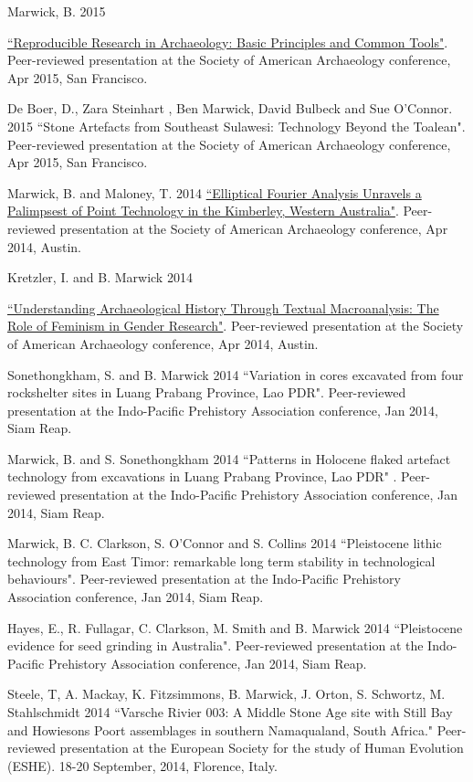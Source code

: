 \ind Marwick, B. 2015 {\href{https://github.com/benmarwick/SAA2015-Open-Methods}{``Reproducible Research in Archaeology: Basic Principles and Common Tools"}. Peer-reviewed presentation at the Society of American Archaeology conference, Apr 2015, San Francisco.

\ind De Boer, D., Zara Steinhart , Ben Marwick, David Bulbeck and Sue O'Connor. 2015 ``Stone Artefacts from Southeast Sulawesi: Technology Beyond the Toalean". Peer-reviewed presentation at the Society of American Archaeology conference, Apr 2015, San Francisco.

\ind Marwick, B. and Maloney, T. 2014 {\href{https://github.com/benmarwick/marwick-and-maloney-saa2014}{``Elliptical Fourier Analysis Unravels a Palimpsest of Point Technology  in the Kimberley, Western Australia"}}. Peer-reviewed presentation at the Society of American Archaeology conference, Apr 2014, Austin.

\ind Kretzler, I. and B. Marwick 2014 {\href{https://github.com/benmarwick/kretzler-and-marwick-saa2014}{``Understanding Archaeological History Through Textual Macroanalysis: The Role of Feminism in Gender Research"}. Peer-reviewed presentation at the Society of American Archaeology conference, Apr 2014, Austin.

\ind Sonethongkham, S. and B. Marwick 2014 ``Variation in cores excavated from four rockshelter sites in Luang Prabang Province, Lao PDR". Peer-reviewed presentation at the Indo-Pacific Prehistory Association conference, Jan 2014, Siam Reap.

\ind Marwick, B.  and S. Sonethongkham 2014 ``Patterns in Holocene flaked artefact technology from excavations in Luang Prabang Province, Lao PDR" . Peer-reviewed presentation at the Indo-Pacific Prehistory Association conference, Jan 2014, Siam Reap.

\ind Marwick, B. C. Clarkson, S. O’Connor and S. Collins 2014 ``Pleistocene lithic technology from East Timor: remarkable long term stability in technological behaviours". Peer-reviewed presentation at the Indo-Pacific Prehistory Association conference, Jan 2014, Siam Reap.

\ind Hayes, E., R. Fullagar, C. Clarkson, M. Smith and B. Marwick 2014 ``Pleistocene evidence for seed grinding in Australia". Peer-reviewed presentation at the Indo-Pacific Prehistory Association conference, Jan 2014, Siam Reap.

\ind Steele, T, A. Mackay, K. Fitzsimmons, B. Marwick, J. Orton, S. Schwortz, M. Stahlschmidt 2014 ``Varsche Rivier 003: A Middle Stone Age site with Still Bay and Howiesons Poort assemblages in southern Namaqualand, South Africa." Peer-reviewed presentation at the European Society for the study of Human Evolution (ESHE). 18-20 September, 2014, Florence, Italy.

}}
